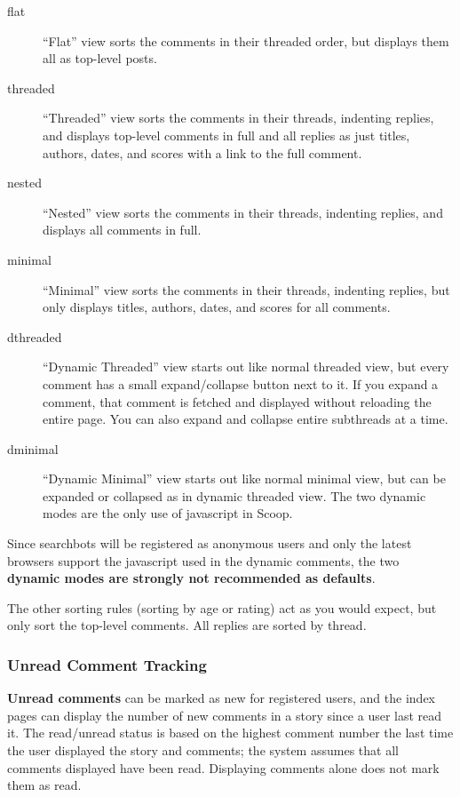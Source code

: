 \begin{description}
\item[flat] ``Flat'' view sorts the comments in their threaded order, but displays them all as top-level posts.
\item[threaded] ``Threaded'' view sorts the comments in their threads, indenting replies, and displays top-level comments in full and all replies as just titles, authors, dates, and scores with a link to the full comment.
\item[nested] ``Nested'' view sorts the comments in their threads, indenting replies, and displays all comments in full.
\item[minimal] ``Minimal'' view sorts the comments in their threads, indenting replies, but only displays titles, authors, dates, and scores for all comments.
\item[dthreaded] ``Dynamic Threaded'' view starts out like normal threaded view, but every comment has a small expand/collapse button next to it.  If you expand a comment, that comment is fetched and displayed without reloading the entire page.  You can also expand and collapse entire subthreads at a time.
\item[dminimal] ``Dynamic Minimal'' view starts out like normal minimal view, but can be expanded or collapsed as in dynamic threaded view.  The two dynamic modes are the only use of javascript in Scoop. 
\end{description}

Since searchbots will be registered as anonymous users and only the latest browsers support the javascript used in the dynamic comments, the two {\bf dynamic modes are strongly not recommended as defaults}.

The other sorting rules (sorting by age or rating) act as you would expect, but only sort the top-level comments.  All replies are sorted by thread.

\subsubsection{Unread Comment Tracking}
\label{comments-unread}

{\bf Unread comments} can be marked as new for registered users, and the index pages can display the number of new comments in a story since a user last read it.  The read/unread status is based on the highest comment number the last time the user displayed the story and comments; the system assumes that all comments displayed have been read.  Displaying comments alone does not mark them as read.

